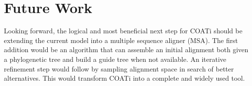 \section{Future Work}
%
%
Looking forward, the logical and most beneficial next step for COATi should be
extending the current model into a multiple sequence aligner (MSA).
The first addition would be an algorithm that can assemble an initial alignment
both given a phylogenetic tree and build a guide tree when not available.
An iterative refinement step would follow by sampling alignment space in search
of better alternatives.
This would transform COATi into a complete and widely used tool.